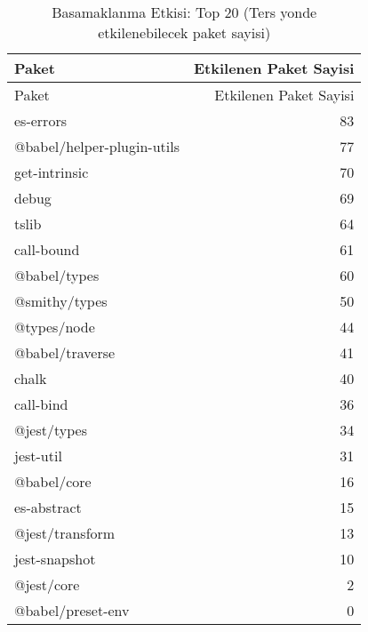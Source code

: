 \begin{longtable}{l r}
\caption{Basamaklanma Etkisi: Top 20 (Ters yonde etkilenebilecek paket sayisi)}\\
\toprule
Paket & Etkilenen Paket Sayisi \\
\midrule
\endfirsthead
\toprule
Paket & Etkilenen Paket Sayisi \\
\midrule
\endhead
\bottomrule
\endfoot
\bottomrule
\endlastfoot
es-errors & 83 \\
@babel/helper-plugin-utils & 77 \\
get-intrinsic & 70 \\
debug & 69 \\
tslib & 64 \\
call-bound & 61 \\
@babel/types & 60 \\
@smithy/types & 50 \\
@types/node & 44 \\
@babel/traverse & 41 \\
chalk & 40 \\
call-bind & 36 \\
@jest/types & 34 \\
jest-util & 31 \\
@babel/core & 16 \\
es-abstract & 15 \\
@jest/transform & 13 \\
jest-snapshot & 10 \\
@jest/core & 2 \\
@babel/preset-env & 0 \\
\end{longtable}
